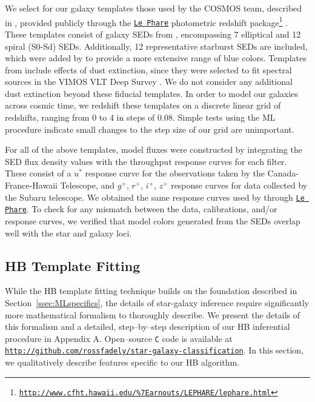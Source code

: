 \documentclass[12pt,preprint]{aastex}
\begin{document}
We select for our galaxy templates those used by the COSMOS team,
described in \citep{ilbert09}, provided publicly through the
\href{http://www.cfht.hawaii.edu/\%7Earnouts/LEPHARE/lephare.html}
{\texttt{Le Phare}} photometric redshift package\footnote{
\href{http://www.cfht.hawaii.edu/\%7Earnouts/LEPHARE/lephare.html}
{\tt http://www.cfht.hawaii.edu/\%7Earnouts/LEPHARE/lephare.html}}
\citep{arnouts99,ilbert06}.  These templates consist of galaxy SEDs
from \citet{polletta07}, encompassing 7 elliptical and 12 spiral
(S0-Sd) SEDs.  Additionally, 12 representative starburst SEDs are
included, which were added by \citet{ilbert09} to provide a more
extensive range of blue colors.  Templates from \citet{polletta07}
include effects of dust extinction, since they were selected to fit
spectral sources in the VIMOS VLT Deep Survey \citep{lefevre05}.  We
do not consider any additional dust extinction beyond these fiducial
templates.  In order to model our galaxies across cosmic time, we
redshift these templates on a discrete linear grid of redshifts,
ranging from 0 to 4 in steps of 0.08.  Simple tests using the ML
procedure indicate small changes to the step size of our grid are
unimportant. 

For all of the above templates, model fluxes were constructed by 
integrating the SED flux density values with the throughput response 
curves for each filter.  These consist of a $u^\ast$ response curve for 
the observations taken by the Canada-France-Hawaii Telescope, and 
$g^+$, $r^+$, $i^+$, $z^+$ response curves for data 
collected by the Subaru telescope.  We obtained the same response 
curves used by \citet{ilbert09} through 
\href{http://www.cfht.hawaii.edu/\%7Earnouts/LEPHARE/lephare.html}
{\texttt{Le Phare}}\footnotemark[5].  To check for any mismatch between 
the data, calibrations, and/or response curves, we verified that model 
colors generated from the SEDs overlap well with the star and galaxy loci.

\subsection{HB Template Fitting}
\label{ssec:HBspecifics}

While the HB template fitting technique builds on the foundation
described in Section~\ref{ssec:MLspecifics}, the details of
star-galaxy inference require significantly more mathematical
formalism to thoroughly describe.  We present the details of this
formalism and a detailed, step--by--step description of our HB
inferential procedure in Appendix A.  Open--source \texttt{C} code is
available at {\footnotesize
  \texttt{\url{http://github.com/rossfadely/star-galaxy-classification}}}.
In this section, we qualitatively describe features specific to our HB
algorithm.
\end{document}
